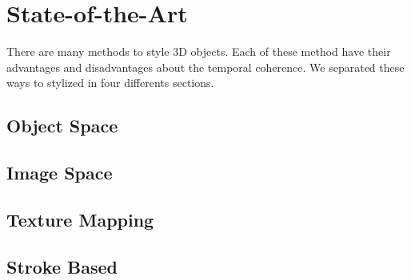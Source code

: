 \chapter{State-of-the-Art}

There are many methods to style 3D objects. Each of these method have their advantages and disadvantages about the temporal coherence. We separated these ways to stylized in four differents sections.

\section{Object Space}

\section{Image Space}

\section{Texture Mapping}

\section{Stroke Based}
